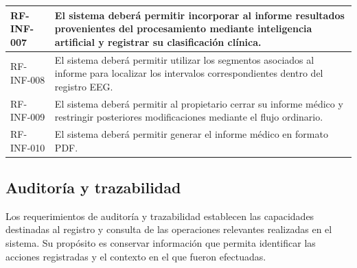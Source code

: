 \begin{longtable}{|p{}|p{}|}
    RF-INF-007 &
    El sistema deberá permitir incorporar al informe resultados provenientes
    del procesamiento mediante inteligencia artificial y registrar su
    clasificación clínica. \\
    \hline

    RF-INF-008 &
    El sistema deberá permitir utilizar los segmentos asociados al informe para
    localizar los intervalos correspondientes dentro del registro EEG. \\
    \hline

    RF-INF-009 &
    El sistema deberá permitir al propietario cerrar su informe médico y
    restringir posteriores modificaciones mediante el flujo ordinario. \\
    \hline

    RF-INF-010 &
    El sistema deberá permitir generar el informe médico en formato PDF. \\
    \hline
\end{longtable}


\subsection{Auditoría y trazabilidad}
\label{subsec:rf-auditoria}

Los requerimientos de auditoría y trazabilidad establecen las capacidades
destinadas al registro y consulta de las operaciones relevantes realizadas
en el sistema. Su propósito es conservar información que permita identificar
las acciones registradas y el contexto en el que fueron efectuadas.

